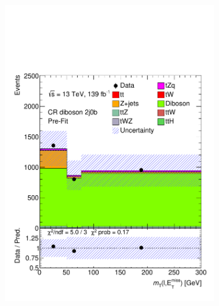 \begin{figure}[!h]
\begin{subfigure}[b]{0.33\linewidth}
    \includegraphics[width=\textwidth]{ubonn-thesis/Chapters/Chapters_07/Figure/Data/CR_2j0b.pdf} 
  \end{subfigure}%
  \begin{subfigure}[b]{0.33\linewidth}
    \centering

\end{subfigure}
\end{figure}
